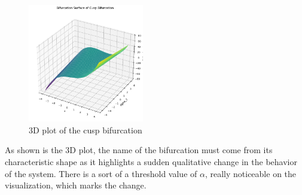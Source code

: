 \begin{figure} [H]
    \centering
    \includegraphics[width=0.45\textwidth]{images/task3/cusp-bifurcation.png}
    \caption{3D plot of the cusp bifurcation}
    \label{fig:task3_cusp-bif}
\end{figure}

As shown is the 3D plot, the name of the bifurcation must come from its characteristic shape as it highlights a sudden qualitative change in the behavior of the system. There is a sort of a threshold value of $\alpha$, really noticeable on the visualization, which marks the change. 

